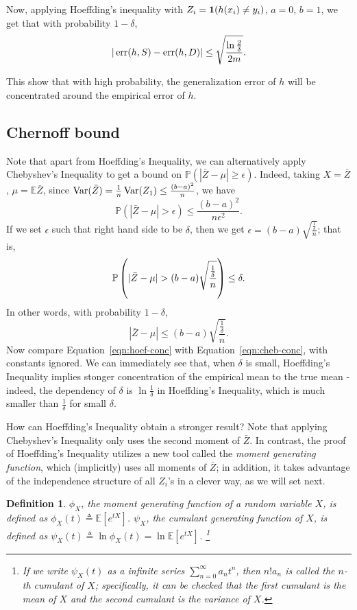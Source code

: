 \documentclass{article}
\newtheorem{theorem}{Theorem}
\newtheorem{definition}{Definition}
\DeclareMathOperator*{\Var}{{\rm Var}}
\DeclareMathOperator*{\err}{{\rm err}}
\newcommand{\EE}{\mathbb{E}} %
\newcommand{\PP}{\mathbb{P}} %
\newcommand{\defeq}{\triangleq}
\newcommand*{\one}{{\bf 1}}
\begin{document}
Now, applying Hoeffding's inequality with $Z_i = \one(h(x_i) \neq y_i)$, $a = 0$, $b = 1$, we get that with probability $1-\delta$,
\[ |\err(h, S) - \err(h, D)| \leq \sqrt{\frac{\ln\frac{2}{\delta}}{2m}}. \]

This show that with high probability, the generalization error of $h$ will be
concentrated around the empirical error of $h$.
\subsection{Chernoff bound}
Note that apart from Hoeffding's Inequality, we can alternatively apply Chebyshev's Inequality to get a bound on
$\PP(| \bar{Z} - \mu|  \geq \epsilon)$. Indeed, taking $X = \bar{Z}$,
$\mu = \EE \bar{Z}$, since $\Var(\bar{Z}) = \frac{1}{n} \Var(Z_1) \leq \frac{(b-a)^2}{n}$,
we have
\[ \PP(| \bar{Z} - \mu| > \epsilon) \leq \frac{(b-a)^2}{n \epsilon^2}. \]
If we set $\epsilon$ such that right hand side to be $\delta$, then we get
$\epsilon = (b-a) \sqrt{\frac{\frac{1}{\delta}}{n}}$; that is,
\[ \PP \del{ | \bar{Z} - \mu| > (b-a) \sqrt{\frac{\frac{1}{\delta}}{n}} } \leq \delta. \]
In other words, with probability $1-\delta$,
\begin{equation}
  | \bar{Z} - \mu| \leq (b-a) \sqrt{\frac{\frac{1}{\delta}}{n}}.
  \label{eqn:cheb-conc}
\end{equation}
Now compare Equation~\eqref{eqn:hoef-conc} with Equation~\eqref{eqn:cheb-conc}, with
constants ignored. We can immediately see that, when $\delta$ is small, Hoeffding's
Inequality implies stonger concentration of the empirical mean to the true mean -
indeed, the dependency of $\delta$ is $\ln\frac{1}{\delta}$ in Hoeffding's
Inequality, which is much smaller than $\frac{1}{\delta}$ for small $\delta$.

How can Hoeffding's Inequality obtain a stronger result? Note that applying Chebyshev's
Inequality only uses the second moment of $\bar{Z}$. In contrast, the proof of Hoeffding's Inequality utilizes
a new tool called the {\em moment generating function}, which (implicitly)
uses all moments of $\bar{Z}$; in addition, it takes advantage of the independence
structure of all $Z_i$'s in a clever way, as we will set next.

\begin{definition}
$\phi_X$, the moment generating function of a random variable $X$, is defined as
$\phi_X(t) \defeq \EE[e^{t X}]$.
$\psi_X$, the cumulant generating function of $X$, is defined as
$\psi_X(t) \defeq \ln \phi_X(t) = \ln \EE[e^{t X}]$. \footnote{If we write
$\psi_X(t)$ as a infinite series $\sum_{n=0}^\infty a_n t^n$, then $n! a_n$ is called the $n$-th cumulant of $X$; specifically, it can be checked that the first cumulant is the mean of $X$ and
the second cumulant is the variance of $X$.}
\end{definition}
\end{document}
